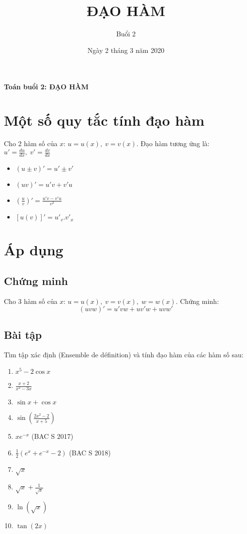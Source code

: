 
\title{ĐẠO HÀM}
\date{Ngày 2 tháng 3 năm 2020}
\author{Buổi 2}


	\begin{center}
		\textbf{Toán buổi 2: ĐẠO HÀM}
	\end{center}
	\section{Một số quy tắc tính đạo hàm}
	Cho 2 hàm số của $x$: $u = u(x), \; v = v(x)$. Đạo hàm tương ứng là: $u' = \frac{du}{dx},\; v' = \frac{dv}{dx}$
	\begin{itemize}
		\item $(u\pm v)' = u' \pm v' $
		\item $(uv)' = u'v + v'u$
		\item $(\frac{u}{v})' = \frac{u'v - v'u}{v^2} $
		\item $[u(v)]' = u'_v . v'_x$
	\end{itemize}

	\section{Áp dụng}
	\subsection{Chứng minh}
	Cho 3 hàm số của $x$: $u = u(x), \; v = v(x), \; w = w(x)$. Chứng minh:
	$$(uvw)' = u'vw + uv'w + uvw' $$
	
	\subsection{Bài tập }
	Tìm tập xác định (Ensemble de définition) và tính đạo hàm của các hàm số sau:
	\begin{enumerate}
		\item $x^5-2\cos x$
		\item $\frac{x+2}{x^2-3x} $
		\item $\sin x + \cos x $
		\item $\sin \left(\frac{2x^2-2}{x+5}\right)$
		\item $xe^{-x} $ (BAC S 2017)
		\item $\frac{1}{2} (e^x + e^{-x} - 2) $ (BAC S 2018)
		\item $\sqrt{x} $
		\item $ \sqrt{x} + \frac{1}{\sqrt{x}}$
		\item $\ln(\sqrt{x}) $
		\item $\tan(2x) $
	\end{enumerate}
